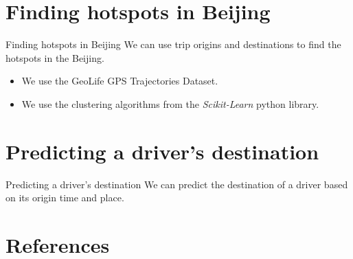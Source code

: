 \documentclass[aspectratio=169]{beamer}
\begin{document}
\section{Finding hotspots in Beijing}

\begin{frame}{Finding hotspots in Beijing}
We can use trip origins and destinations to find the hotspots in the Beijing.

\begin{itemize}
	\item We use the GeoLife GPS Trajectories Dataset.
	\item We use the clustering algorithms from the \textit{Scikit-Learn} python library\cite{pedregosa2011scikit}.
\end{itemize}
\end{frame}


\section{Predicting a driver's destination}

\begin{frame}{Predicting a driver's destination}
We can predict the destination of a driver based on its origin time and place.

\begin{itemize}
	
\end{itemize}
\end{frame}



\section*{References}

\end{document}
